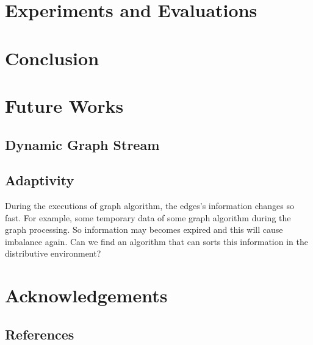 \documentclass{article}
\begin{document}
	\section{Experiments and Evaluations}

	\section{Conclusion}

	\section{Future Works}
	\subsection{Dynamic Graph Stream}
	\subsection{Adaptivity}
	During the executions of graph algorithm, the edges's information changes so fast. For example, some temporary data of some graph algorithm during the graph processing. So information may becomes expired and this will cause imbalance again. Can we find an algorithm that can sorts this information in the distributive environment?

	\section{Acknowledgements}

	\begin{appendix}
		\section{References}
		
		
	\end{appendix}
\end{document}
